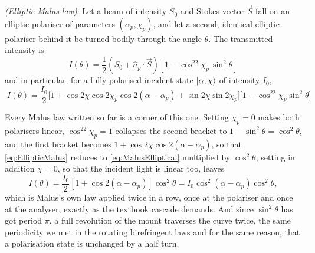             \begin{myteo}
                \textit{(Elliptic Malus law)}: Let a beam of intensity $S_0$ and Stokes vector $\vec{S}$ fall on an elliptic polariser of parameters $\left(\alpha_p,\chi_p\right)$, and let a second, identical elliptic polariser behind it be turned bodily through the angle $\theta$. The transmitted intensity is
                \begin{equation}\label{eq:EllipticMalusGeneral}
                    \boxed{\;I(\theta) = \frac{1}{2}\left(S_0+\hat{n}_p\cdot\vec{S}\right)\left[1-\cos^22\chi_p\,\sin^2\theta\right]\;}
                \end{equation}
                and in particular, for a fully polarised incident state $\ket{\alpha;\chi}$ of intensity $I_0$,
                \begin{equation}\label{eq:EllipticMalus}
                    \boxed{\;I(\theta) = \frac{I_0}{2}\Big[1+\cos2\chi\cos2\chi_p\cos2\left(\alpha-\alpha_p\right)+\sin2\chi\sin2\chi_p\Big]\Big[1-\cos^22\chi_p\sin^2\theta\Big]\;}
                \end{equation}
            \end{myteo}

            Every Malus law written so far is a corner of this one. Setting $\chi_p=0$ makes both polarisers linear, $\cos^22\chi_p=1$ collapses the second bracket to $1-\sin^2\theta=\cos^2\theta$, and the first bracket becomes $1+\cos2\chi\cos2(\alpha-\alpha_p)$, so that \ref{eq:EllipticMalus} reduces to \ref{eq:MalusElliptical} multiplied by $\cos^2\theta$; setting in addition $\chi=0$, so that the incident light is linear too, leaves
            \begin{equation*}
                I(\theta) = \frac{I_0}{2}\left[1+\cos2\left(\alpha-\alpha_p\right)\right]\cos^2\theta = I_0\cos^2\left(\alpha-\alpha_p\right)\cos^2\theta ,
            \end{equation*}
            which is Malus's own law applied twice in a row, once at the polariser and once at the analyser, exactly as the textbook cascade demands. And since $\sin^2\theta$ has got period $\pi$, a full revolution of the mount traverses the curve twice, the same periodicity we met in the rotating birefringent laws and for the same reason, that a polarisation state is unchanged by a half turn.

